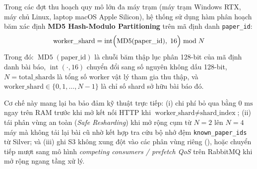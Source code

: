 Trong các đợt thu hoạch quy mô lớn đa máy trạm (máy trạm Windows RTX, máy chủ Linux, laptop macOS Apple Silicon), hệ thống sử dụng hàm phân hoạch băm xác định \textbf{MD5 Hash-Modulo Partitioning} trên mã định danh \texttt{paper\_id}:
\begin{equation}
  \text{worker\_shard} = \operatorname{int}\Bigl(\operatorname{MD5}(\text{paper\_id}),\; 16\Bigr) \bmod N
  \label{eq:ch2_md5_shard}
\end{equation}
\noindent Trong đó: $\operatorname{MD5}(\text{paper\_id})$ là chuỗi băm thập lục phân 128-bit của mã định danh bài báo, $\operatorname{int}(\cdot, 16)$ chuyển đổi sang số nguyên không dấu 128-bit, $N = \text{total\_shards}$ là tổng số worker vật lý tham gia thu thập, và $\text{worker\_shard} \in \{0, 1, \dots, N-1\}$ là chỉ số shard sở hữu bài báo đó.

Cơ chế này mang lại ba bảo đảm kỹ thuật trực tiếp: (i) chi phí bỏ qua bằng $0\text{ ms}$ ngay trên RAM trước khi mở kết nối HTTP khi $\text{worker\_shard} \neq \text{shard\_index}$; (ii) tái phân vùng an toàn (\textit{Safe Resharding}) khi mở rộng cụm từ $N=2$ lên $N=4$ máy mà không tải lại bài cũ nhờ kết hợp tra cứu bộ nhớ đệm \texttt{known\_paper\_ids} từ Silver; và (iii) ghi S3 không xung đột vào các phân vùng riêng (), hoặc chuyển tiếp mượt sang mô hình \textit{competing consumers / prefetch QoS} trên RabbitMQ khi mở rộng ngang tầng xử lý.
\FloatBarrier

